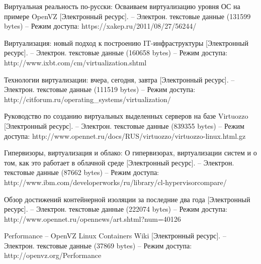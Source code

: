 \begin{thebibliography}{00}
    Виртуальная реальность по-русски: Осваиваем виртуализацию уровня ОС на примере OpenVZ
    [Электронный ресурс]. --
    Электрон. текстовые данные (131599 bytes) -- 
    Режим доступа: https://xakep.ru/2011/08/27/56244/

    Виртуализация: новый подход к построению IT-инфраструктуры
    [Электронный ресурс]. --
    Электрон. текстовые данные (160658 bytes) -- 
    Режим доступа: http://www.ixbt.com/cm/virtualization.shtml

    Технологии виртуализации: вчера, сегодня, завтра
    [Электронный ресурс]. --
    Электрон. текстовые данные (111519 bytes) -- 
    Режим доступа: http://citforum.ru/operating\_systems/virtualization/

    Руководство по созданию виртуальных выделенных серверов на базе Virtuozzo
    [Электронный ресурс]. --
    Электрон. текстовые данные (839355 bytes) -- 
    Режим доступа: http://www.opennet.ru/docs/RUS/virtuozzo/virtuozzo-linux.html.gz

    Гипервизоры, виртуализация и облако: О гипервизорах, виртуализации систем и о том, как это работает в облачной среде
    [Электронный ресурс]. --
    Электрон. текстовые данные (87662 bytes) -- 
    Режим доступа: http://www.ibm.com/developerworks/ru/library/cl-hypervisorcompare/

    Обзор достижений контейнерной изоляции за последние два года
    [Электронный ресурс]. --
    Электрон. текстовые данные (222074 bytes) -- 
    Режим доступа: http://www.opennet.ru/opennews/art.shtml?num=40126

    Performance -- OpenVZ Linux Containers Wiki
    [Электронный ресурс]. --
    Электрон. текстовые данные (37869 bytes) -- 
    Режим доступа: http://openvz.org/Performance

\end{thebibliography}
\endgroup

\clearpage
